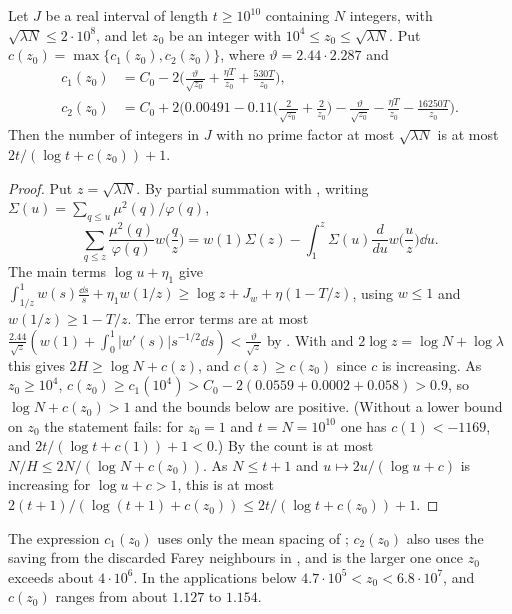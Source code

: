 \documentclass[11pt,colorlinks]{charlie}
\begin{document}
\begin{proposition}\label{prop:count}
Let $J$ be a real interval of length $t\ge10^{10}$ containing $N$ integers, with $\sqrt{\lambda N}\le2\cdot10^8$, and let $z_0$ be an integer with $10^4\le z_0\le\sqrt{\lambda N}$. Put
$c(z_0)=\max\{c_1(z_0),c_2(z_0)\}$, where $\vartheta=2.44\cdot2.287$ and
\begin{align*}
 c_1(z_0)&=C_0-2\Big(\frac{\vartheta}{\sqrt{z_0}}+\frac{\eta T}{z_0}+\frac{530T}{z_0}\Big),\\
 c_2(z_0)&=C_0+2\Big(0.00491-0.11\Big(\frac2{\sqrt{z_0}}+\frac2{z_0}\Big)-\frac{\vartheta}{\sqrt{z_0}}-\frac{\eta T}{z_0}-\frac{16250T}{z_0}\Big).
\end{align*}
Then the number of integers in $J$ with no prime factor at most $\sqrt{\lambda N}$ is at most $2t/(\log t+c(z_0))+1$.
\end{proposition}
\begin{proof}
Put $z=\sqrt{\lambda N}$. By partial summation with , writing $\Sigma(u)=\sum_{q\le u}\mu^2(q)/\varphi(q)$,
\[
 \sum_{q\le z}\frac{\mu^2(q)}{\varphi(q)}w\Big(\frac qz\Big)=w(1)\Sigma(z)-\int_1^z\Sigma(u)\frac{d}{du}w\Big(\frac uz\Big)\dd u .
\]
The main terms $\log u+\eta_1$ give $\int_{1/z}^1w(s)\frac{\dd s}s+\eta_1w(1/z)\ge\log z+J_w+\eta(1-T/z)$, using $w\le1$ and $w(1/z)\ge1-T/z$. The error terms are at most $\frac{2.44}{\sqrt z}(w(1)+\int_0^1|w'(s)|s^{-1/2}\dd s)<\frac{\vartheta}{\sqrt z}$ by . With  and $2\log z=\log N+\log\lambda$ this gives $2H\ge\log N+c(z)$, and $c(z)\ge c(z_0)$ since $c$ is increasing. As $z_0\ge10^4$, $c(z_0)\ge c_1(10^4)>C_0-2(0.0559+0.0002+0.058)>0.9$, so $\log N+c(z_0)>1$ and the bounds below are positive. (Without a lower bound on $z_0$ the statement fails: for $z_0=1$ and $t=N=10^{10}$ one has $c(1)<-1169$, and $2t/(\log t+c(1))+1<0$.) By  the count is at most $N/H\le2N/(\log N+c(z_0))$. As $N\le t+1$ and $u\mapsto2u/(\log u+c)$ is increasing for $\log u+c>1$, this is at most $2(t+1)/(\log(t+1)+c(z_0))\le2t/(\log t+c(z_0))+1$.
\end{proof}

\begin{remark}
The expression $c_1(z_0)$ uses only the mean spacing of ; $c_2(z_0)$ also uses the saving from the discarded Farey neighbours in , and is the larger one once $z_0$ exceeds about $4\cdot10^6$. In the applications below $4.7\cdot10^5<z_0<6.8\cdot10^7$, and $c(z_0)$ ranges from about $1.127$ to $1.154$.
\end{remark}
\end{document}
